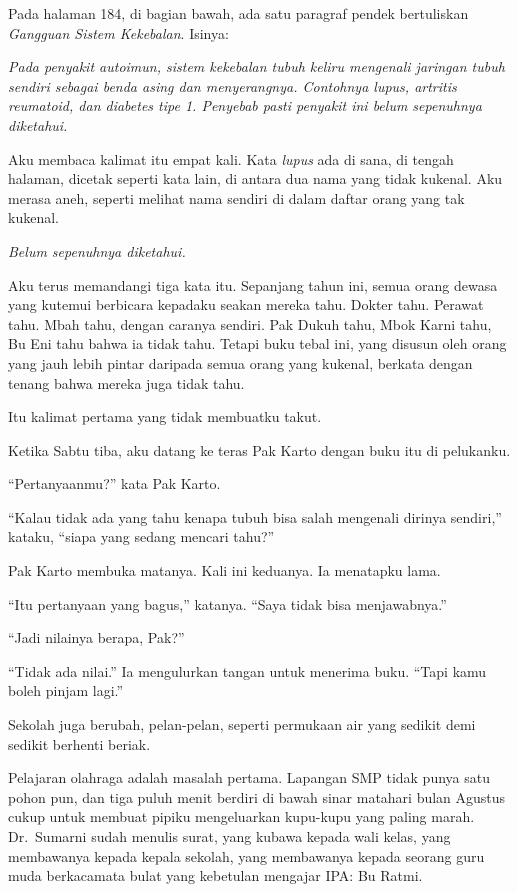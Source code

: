 \documentclass[11pt,twoside,openany]{book}
\makeatletter
\newcommand{\scenebreak}{\par\vspace{0.9em}{\centering\textsc{*\hspace{0.7em}*\hspace{0.7em}*}\par}\vspace{0.9em}\@afterindentfalse\@afterheading}
\makeatother
\begin{document}
Pada halaman 184, di bagian bawah, ada satu paragraf pendek bertuliskan \emph{Gangguan Sistem Kekebalan}. Isinya:

\emph{Pada penyakit autoimun, sistem kekebalan tubuh keliru mengenali jaringan tubuh sendiri sebagai benda asing dan menyerangnya. Contohnya lupus, artritis reumatoid, dan diabetes tipe 1. Penyebab pasti penyakit ini belum sepenuhnya diketahui.}

Aku membaca kalimat itu empat kali. Kata \emph{lupus} ada di sana, di tengah halaman, dicetak seperti kata lain, di antara dua nama yang tidak kukenal. Aku merasa aneh, seperti melihat nama sendiri di dalam daftar orang yang tak kukenal.

\emph{Belum sepenuhnya diketahui.}

Aku terus memandangi tiga kata itu. Sepanjang tahun ini, semua orang dewasa yang kutemui berbicara kepadaku seakan mereka tahu. Dokter tahu. Perawat tahu. Mbah tahu, dengan caranya sendiri. Pak Dukuh tahu, Mbok Karni tahu, Bu Eni tahu bahwa ia tidak tahu. Tetapi buku tebal ini, yang disusun oleh orang yang jauh lebih pintar daripada semua orang yang kukenal, berkata dengan tenang bahwa mereka juga tidak tahu.

Itu kalimat pertama yang tidak membuatku takut.

Ketika Sabtu tiba, aku datang ke teras Pak Karto dengan buku itu di pelukanku.

``Pertanyaanmu?'' kata Pak Karto.

``Kalau tidak ada yang tahu kenapa tubuh bisa salah mengenali dirinya sendiri,'' kataku, ``siapa yang sedang mencari tahu?''

Pak Karto membuka matanya. Kali ini keduanya. Ia menatapku lama.

``Itu pertanyaan yang bagus,'' katanya. ``Saya tidak bisa menjawabnya.''

``Jadi nilainya berapa, Pak?''

``Tidak ada nilai.'' Ia mengulurkan tangan untuk menerima buku. ``Tapi kamu boleh pinjam lagi.''

\scenebreak
Sekolah juga berubah, pelan-pelan, seperti permukaan air yang sedikit demi sedikit berhenti beriak.

Pelajaran olahraga adalah masalah pertama. Lapangan SMP tidak punya satu pohon pun, dan tiga puluh menit berdiri di bawah sinar matahari bulan Agustus cukup untuk membuat pipiku mengeluarkan kupu-kupu yang paling marah. Dr.~Sumarni sudah menulis surat, yang kubawa kepada wali kelas, yang membawanya kepada kepala sekolah, yang membawanya kepada seorang guru muda berkacamata bulat yang kebetulan mengajar IPA: Bu Ratmi.
\end{document}

